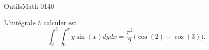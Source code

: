 
\begin{corrige}{OutilsMath-0140}

    L'intégrale à calculer est
    \begin{equation}
        \int_2^3\int_0^{\pi}y\sin(x)dydx=\frac{ \pi^2 }{2}\big(\cos(2)-\cos(3)).
    \end{equation}

\end{corrige}
